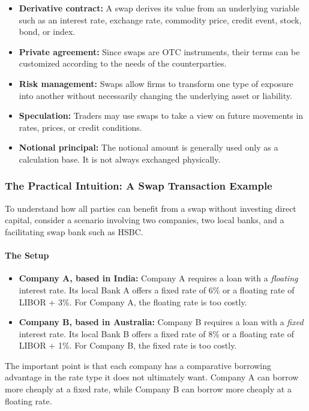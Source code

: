 \documentclass[12pt,openany]{book}
\begin{document}
\begin{itemize}[leftmargin=*]
    \item \textbf{Derivative contract:} A swap derives its value from an underlying variable such as an interest rate, exchange rate, commodity price, credit event, stock, bond, or index.
    \item \textbf{Private agreement:} Since swaps are OTC instruments, their terms can be customized according to the needs of the counterparties.
    \item \textbf{Risk management:} Swaps allow firms to transform one type of exposure into another without necessarily changing the underlying asset or liability.
    \item \textbf{Speculation:} Traders may use swaps to take a view on future movements in rates, prices, or credit conditions.
    \item \textbf{Notional principal:} The notional amount is generally used only as a calculation base. It is not always exchanged physically.
\end{itemize}

\subsubsection{The Practical Intuition: A Swap Transaction Example}
To understand how all parties can benefit from a swap without investing direct capital, consider a scenario involving two companies, two local banks, and a facilitating swap bank such as HSBC.

\paragraph{The Setup}

\begin{itemize}[leftmargin=*]
    \item \textbf{Company A, based in India:} Company A requires a loan with a \textit{floating} interest rate. Its local Bank A offers a fixed rate of 6\% or a floating rate of LIBOR + 3\%. For Company A, the floating rate is too costly.
    \item \textbf{Company B, based in Australia:} Company B requires a loan with a \textit{fixed} interest rate. Its local Bank B offers a fixed rate of 8\% or a floating rate of LIBOR + 1\%. For Company B, the fixed rate is too costly.
\end{itemize}

The important point is that each company has a comparative borrowing advantage in the rate type it does not ultimately want. Company A can borrow more cheaply at a fixed rate, while Company B can borrow more cheaply at a floating rate.
\end{document}
